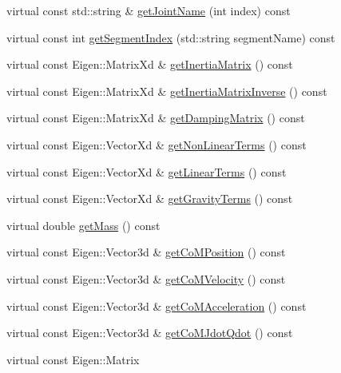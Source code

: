 \begin{DoxyCompactItemize}
\item 
virtual const std\-::string \& \hyperlink{classocra__icub_1_1OcraWbiModel_a83d6bc29496259e0f23cc085e29aa431}{get\-Joint\-Name} (int index) const 
\item 
virtual const int \hyperlink{classocra__icub_1_1OcraWbiModel_a1d0f2eb31988a8c91b11a3343392fcf9}{get\-Segment\-Index} (std\-::string segment\-Name) const 
\item 
virtual const \-Eigen\-::\-Matrix\-Xd \& \hyperlink{classocra__icub_1_1OcraWbiModel_a49df5e4d811b660c72b35b6d822bb529}{get\-Inertia\-Matrix} () const 
\item 
virtual const \-Eigen\-::\-Matrix\-Xd \& \hyperlink{classocra__icub_1_1OcraWbiModel_a2dfc6cc2f527cc3aec668607b36e5fe9}{get\-Inertia\-Matrix\-Inverse} () const 
\item 
virtual const \-Eigen\-::\-Matrix\-Xd \& \hyperlink{classocra__icub_1_1OcraWbiModel_ae8bc8fbe99ae23b45a40ec867ca066f9}{get\-Damping\-Matrix} () const 
\item 
virtual const \-Eigen\-::\-Vector\-Xd \& \hyperlink{classocra__icub_1_1OcraWbiModel_a8cf1d870edf8c069cb1b196e0cab1f67}{get\-Non\-Linear\-Terms} () const 
\item 
virtual const \-Eigen\-::\-Vector\-Xd \& \hyperlink{classocra__icub_1_1OcraWbiModel_aa85e588223e6c40dabb740089b2cf3ea}{get\-Linear\-Terms} () const 
\item 
virtual const \-Eigen\-::\-Vector\-Xd \& \hyperlink{classocra__icub_1_1OcraWbiModel_a57742157dce7e3526a388be7d11321d3}{get\-Gravity\-Terms} () const 
\item 
virtual double \hyperlink{classocra__icub_1_1OcraWbiModel_a7f52d830940df32916f46b905d985505}{get\-Mass} () const 
\item 
virtual const \-Eigen\-::\-Vector3d \& \hyperlink{classocra__icub_1_1OcraWbiModel_a3af6973d940c01a80085d65841bb27a8}{get\-Co\-M\-Position} () const 
\item 
virtual const \-Eigen\-::\-Vector3d \& \hyperlink{classocra__icub_1_1OcraWbiModel_af7f16945aafd4881f1cfd94498a78ebf}{get\-Co\-M\-Velocity} () const 
\item 
virtual const \-Eigen\-::\-Vector3d \& \hyperlink{classocra__icub_1_1OcraWbiModel_a7e5f552f463bf58b1c9828575c78ee90}{get\-Co\-M\-Acceleration} () const 
\item 
virtual const \-Eigen\-::\-Vector3d \& \hyperlink{classocra__icub_1_1OcraWbiModel_a0985fe02b87fa9bcf90439163c622a71}{get\-Co\-M\-Jdot\-Qdot} () const 
\item 
virtual const \-Eigen\-::\-Matrix\*

\end{DoxyCompactItemize}
